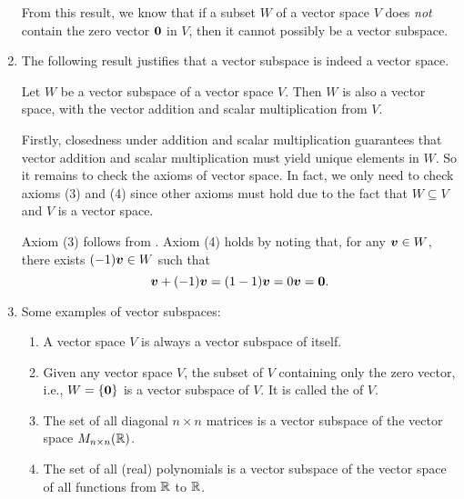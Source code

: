 \begin{enumerate}
From this result, we know that if a subset \(W\) of a vector space \(V\) does
\emph{not} contain the zero vector \(\vb*{0}\) in \(V\), then it cannot
possibly be a vector subspace.

\item The following result justifies that a vector subspace is indeed a vector
space.
\begin{proposition}
\label{prp:vec-subsp-is-vec-sp}
Let \(W\) be a vector subspace of a vector space \(V\). Then \(W\) is also a
vector space, with the vector addition and scalar multiplication from \(V\).
\end{proposition}
\begin{pf}
Firstly, closedness under addition and scalar multiplication guarantees that
vector addition and scalar multiplication must yield unique elements in \(W\).
So it remains to check the axioms of vector space. In fact, we only need to
check axioms (3) and (4) since other axioms must hold due to the fact that
\(W\subseteq V\) and \(V\) is a vector space.

Axiom (3) follows from . Axiom (4) holds by
noting that, for any \(\vb*{v}\in W\), there exists \((-1)\vb*{v}\in W\) such
that
\[
\vb*{v}+(-1)\vb*{v}=(1-1)\vb*{v}=0\vb*{v}=\vb*{0}.
\]
\end{pf}
\item Some examples of vector subspaces:
\begin{enumerate}
\item A vector space \(V\) is always a vector subspace of itself.
\item Given any vector space \(V\), the subset of \(V\) containing only the
zero vector, i.e., \(W=\{\vb*{0}\}\) is a vector subspace of \(V\). It is
called the  of \(V\).
\item The set of all diagonal \(n\times n\) matrices is a vector subspace of the
vector space \(M_{n\times n}(\mathbb{R})\).
\item The set of all (real) polynomials is a vector subspace of the vector
space of all functions from \(\mathbb{R}\) to \(\mathbb{R}\).
\end{enumerate}
\end{enumerate}
